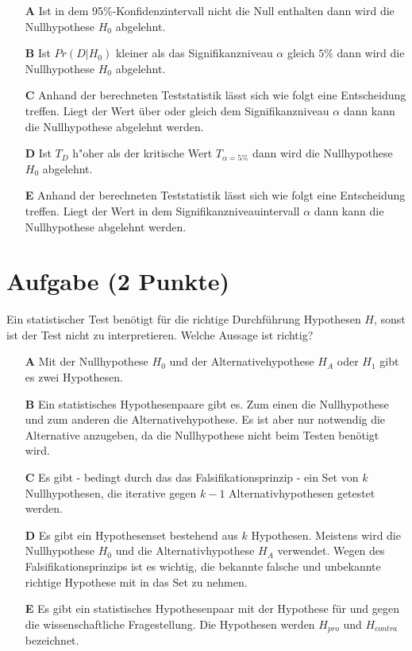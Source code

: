 \documentclass[a4paper, 9pt]{scrartcl}\usepackage[]{graphicx}\usepackage[]{xcolor}
\begin{document}
\begin{enumerate}
\item [\textbf{A} \msquare] Ist in dem 95\%-Konfidenzintervall nicht die Null enthalten dann wird die Nullhypothese $H_0$ abgelehnt.
\item [\textbf{B} \msquare] Ist $Pr(D|H_0)$ kleiner als das Signifikanzniveau $\alpha$ gleich $5\%$ dann wird die Nullhypothese $H_0$ abgelehnt.
\item [\textbf{C} \msquare] Anhand der berechneten Teststatistik lässt sich wie folgt eine Entscheidung treffen. Liegt der Wert über oder gleich dem Signifikanzniveau $\alpha$ dann kann die Nullhypothese abgelehnt werden.
\item [\textbf{D} \msquare] Ist $T_{D}$ h{"o}her als der kritische Wert $T_{\alpha = 5\%}$ dann wird die Nullhypothese $H_0$ abgelehnt.
\item [\textbf{E} \msquare] Anhand der berechneten Teststatistik lässt sich wie folgt eine Entscheidung treffen. Liegt der Wert in dem Signifikanzniveauintervall $\alpha$ dann kann die Nullhypothese abgelehnt werden.
\end{enumerate}

\section{Aufgabe \hfill (2 Punkte)}



Ein statistischer Test benötigt für die richtige Durchführung Hypothesen $H$, sonst ist der Test nicht zu interpretieren. Welche Aussage ist richtig?



\begin{enumerate}
\item [\textbf{A} \msquare] Mit der Nullhypothese $H_0$ und der Alternativehypothese $H_A$ oder $H_1$ gibt es zwei Hypothesen.
\item [\textbf{B} \msquare] Ein statistisches Hypothesenpaare gibt es. Zum einen die Nullhypothese und zum anderen die Alternativehypothese. Es ist aber nur notwendig die Alternative anzugeben, da die Nullhypothese nicht beim Testen benötigt wird.
\item [\textbf{C} \msquare] Es gibt - bedingt durch das das Falsifikationsprinzip - ein Set von $k$ Nullhypothesen, die iterative gegen $k-1$ Alternativhypothesen getestet werden.
\item [\textbf{D} \msquare] Es gibt ein Hypothesenset bestehend aus $k$ Hypothesen. Meistens wird die Nullhypothese $H_0$ und die Alternativhypothese $H_A$ verwendet. Wegen des Falsifikationsprinzips ist es wichtig, die bekannte falsche und unbekannte richtige Hypothese mit in das Set zu nehmen.
\item [\textbf{E} \msquare] Es gibt ein statistisches Hypothesenpaar mit der Hypothese für und gegen die wissenschaftliche Fragestellung. Die Hypothesen werden $H_{pro}$ und $H_{contra}$ bezeichnet.
\end{enumerate}
\end{document}
